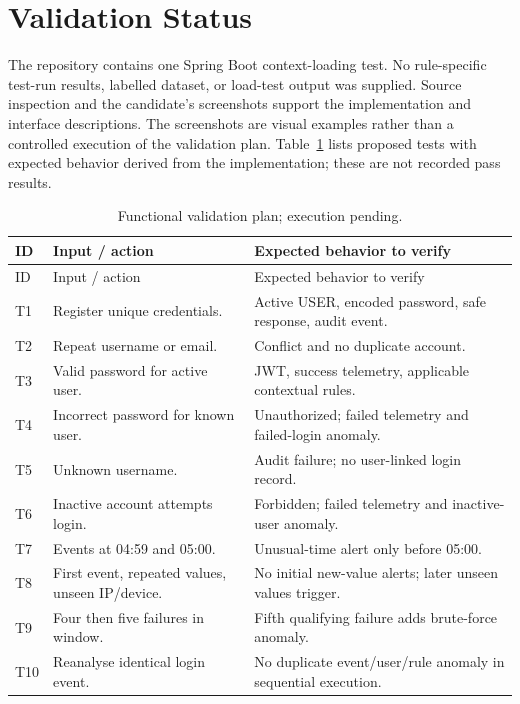 

\clearpage\section{Validation Status}
The repository contains one Spring Boot context-loading test. No rule-specific test-run results, labelled dataset, or load-test output was supplied. Source inspection and the candidate's screenshots support the implementation and interface descriptions. The screenshots are visual examples rather than a controlled execution of the validation plan. Table~\ref{tab:tests} lists proposed tests with expected behavior derived from the implementation; these are not recorded pass results.
\begingroup\small{}\setlength{\parskip}{0pt}
\begin{longtable}{>{\raggedright\arraybackslash}p{0.9cm}>{\raggedright\arraybackslash}p{6.1cm}>{\raggedright\arraybackslash}p{7cm}}
\caption{Functional validation plan; execution pending.}\label{tab:tests}\\\toprule ID & Input / action & Expected behavior to verify\\\midrule\endfirsthead
\toprule ID & Input / action & Expected behavior to verify\\\midrule\endhead
T1 & Register unique credentials. & Active USER, encoded password, safe response, audit event.\\
T2 & Repeat username or email. & Conflict and no duplicate account.\\
T3 & Valid password for active user. & JWT, success telemetry, applicable contextual rules.\\
T4 & Incorrect password for known user. & Unauthorized; failed telemetry and failed-login anomaly.\\
T5 & Unknown username. & Audit failure; no user-linked login record.\\
T6 & Inactive account attempts login. & Forbidden; failed telemetry and inactive-user anomaly.\\
T7 & Events at 04:59 and 05:00. & Unusual-time alert only before 05:00.\\
T8 & First event, repeated values, unseen IP/device. & No initial new-value alerts; later unseen values trigger.\\
T9 & Four then five failures in window. & Fifth qualifying failure adds brute-force anomaly.\\
T10 & Reanalyse identical login event. & No duplicate event/user/rule anomaly in sequential execution.\\

\end{longtable}
